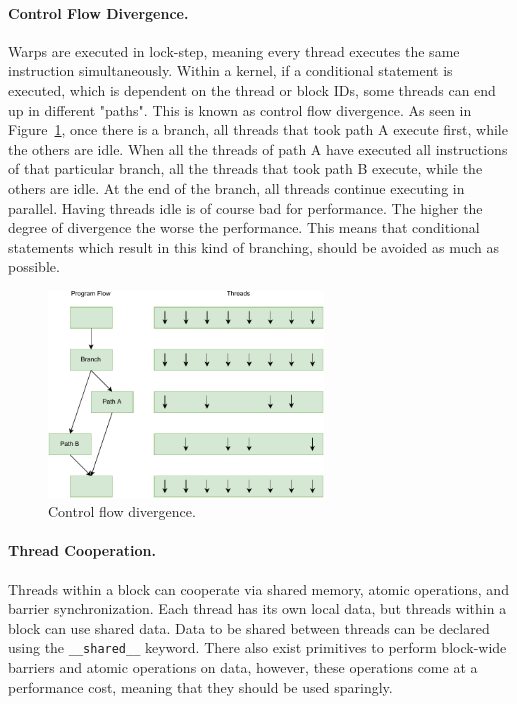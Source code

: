     \paragraph{\textbf{Control Flow Divergence}.} Warps are executed in lock-step, meaning every thread executes the same instruction simultaneously. Within a kernel, if a conditional statement is executed, which is dependent on the thread or block IDs, some threads can end up in different "paths". This is known as control flow divergence. As seen in Figure~\ref{fig:control-div}, once there is a branch, all threads that took path A execute first, while the others are idle. When all the threads of path A have executed all instructions of that particular branch, all the threads that took path B execute, while the others are idle. At the end of the branch, all threads continue executing in parallel. Having threads idle is of course bad for performance. The higher the degree of divergence the worse the performance. This means that conditional statements which result in this kind of branching, should be avoided as much as possible.

\begin{figure}
  \centering
    \includegraphics[width=0.65\textwidth]{Chapters/Figures/Images/control_div.pdf}
    \caption{Control flow divergence.}
\label{fig:control-div}
\end{figure}
    
    \paragraph{\textbf{Thread Cooperation}.} Threads within a block can cooperate via shared memory, atomic operations, and barrier synchronization. Each thread has its own local data, but threads within a block can use shared data. Data to be shared between threads can be declared using the \texttt{\_\_shared\_\_} keyword. There also exist primitives to perform block-wide barriers and atomic operations on data, however, these operations come at a performance cost, meaning that they should be used sparingly.
    
